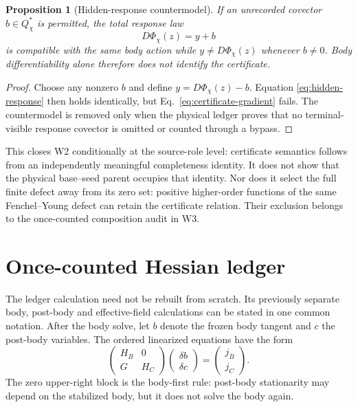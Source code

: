 \documentclass[11pt]{article}
\newtheorem{proposition}{Proposition}
\begin{document}
\begin{proposition}[Hidden-response countermodel]
If an unrecorded covector \(b\in Q_\chi^*\) is permitted, the total response
law
\begin{equation}
 D\Phi_\chi(z)=y+b
 \label{eq:hidden-response}
\end{equation}
is compatible with the same body action while \(y\ne D\Phi_\chi(z)\) whenever
\(b\ne0\).  Body differentiability alone therefore does not identify the
certificate.
\end{proposition}

\begin{proof}
Choose any nonzero \(b\) and define \(y=D\Phi_\chi(z)-b\).  Equation
\eqref{eq:hidden-response} then holds identically, but
Eq.~\eqref{eq:certificate-gradient} fails.  The countermodel is removed only
when the physical ledger proves that no terminal-visible response covector is
omitted or counted through a bypass.
\end{proof}

This closes W2 conditionally at the source-role level: certificate semantics
follows from an independently meaningful completeness identity.  It does not
show that the physical base--seed parent occupies that identity.  Nor does it
select the full finite defect away from its zero set: positive higher-order
functions of the same Fenchel--Young defect can retain the certificate
relation.  Their exclusion belongs to the once-counted composition audit in
W3.

\section{Once-counted Hessian ledger}

The ledger calculation need not be rebuilt from scratch. Its previously
separate body, post-body and effective-field calculations can be stated in one
common notation. After the body solve, let \(b\) denote the frozen body tangent
and \(c\) the post-body variables. The ordered linearized equations have the
form
\begin{equation}
 \begin{pmatrix}H_B&0\\G&H_C\end{pmatrix}
 \begin{pmatrix}\delta b\\\delta c\end{pmatrix}
 =\begin{pmatrix}j_B\\j_C\end{pmatrix}.
 \label{eq:ordered-jacobian}
\end{equation}
The zero upper-right block is the body-first rule: post-body stationarity may
depend on the stabilized body, but it does not solve the body again.
\end{document}
